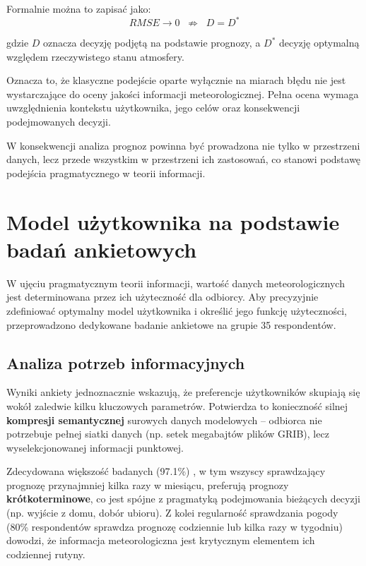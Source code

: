 \documentclass[a4paper,12pt]{article}
\begin{document}
Formalnie można to zapisać jako:
\[
RMSE \rightarrow 0 \;\;\not\Rightarrow\;\; D = D^*
\]

gdzie $D$ oznacza decyzję podjętą na podstawie prognozy,
a $D^*$ decyzję optymalną względem rzeczywistego stanu atmosfery.

Oznacza to, że klasyczne podejście oparte wyłącznie na miarach błędu
nie jest wystarczające do oceny jakości informacji meteorologicznej.
Pełna ocena wymaga uwzględnienia kontekstu użytkownika, jego celów
oraz konsekwencji podejmowanych decyzji.

W konsekwencji analiza prognoz powinna być prowadzona nie tylko
w przestrzeni danych, lecz przede wszystkim w przestrzeni ich zastosowań,
co stanowi podstawę podejścia pragmatycznego w teorii informacji.
\newpage

\section{Model użytkownika na podstawie badań  ankietowych}

W ujęciu pragmatycznym teorii informacji, wartość danych meteorologicznych jest determinowana przez ich użyteczność dla odbiorcy. Aby precyzyjnie zdefiniować optymalny model użytkownika i określić jego funkcję użyteczności, przeprowadzono dedykowane badanie ankietowe na grupie 35 respondentów.

\subsection{Analiza potrzeb informacyjnych}

Wyniki ankiety jednoznacznie wskazują, że preferencje użytkowników skupiają się wokół zaledwie kilku kluczowych parametrów. Potwierdza to konieczność silnej \textbf{kompresji semantycznej} surowych danych modelowych – odbiorca nie potrzebuje pełnej siatki danych (np. setek megabajtów plików GRIB), lecz wyselekcjonowanej informacji punktowej.

Zdecydowana większość badanych (97.1\%) , w tym wszyscy sprawdzający prognozę przynajmniej kilka razy w miesiącu, preferują prognozy \textbf{krótkoterminowe}, co jest spójne z pragmatyką podejmowania bieżących decyzji (np. wyjście z domu, dobór ubioru). Z kolei regularność sprawdzania pogody (80\% respondentów sprawdza prognozę codziennie lub kilka razy w tygodniu) dowodzi, że informacja meteorologiczna jest krytycznym elementem ich codziennej rutyny.
\end{document}
